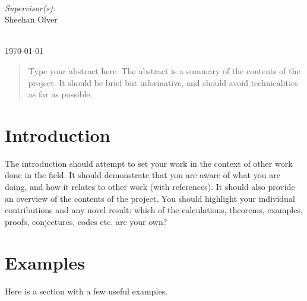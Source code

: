 \documentclass[a4paper,11pt, titlepage]{article}
\theoremstyle{definition}
\theoremstyle{plain}
\theoremstyle{remark}
\newcommand{\supervisor}{Sheehan Olver} %
\begin{document}
\begin{titlepage}
\begin{minipage}{0.4\textwidth}
\end{minipage}
~
\begin{minipage}{0.4\textwidth}
\begin{flushright} \large
\emph{Supervisor(s):} \\
\supervisor %
\end{flushright}
\end{minipage}\\[2cm]
\makeatother
\vfill
\makeatletter
{\large \today}\\[2cm] %
\makeatother
\end{titlepage}

\begin{abstract}
Type your abstract here. The abstract is a summary of the contents of the project. It should be brief but informative, and
should avoid technicalities as far as possible.
\end{abstract}
 
\tableofcontents
\clearpage

\section{Introduction}
\label{sec:introduction}

The introduction should attempt to set your work in the context of other work done in the field. It
should demonstrate that you are aware of what you are doing, and how it relates to other work
(with references). It should also provide an overview of the contents of the project. You should
highlight your individual contributions and any novel result: which of the calculations, theorems,
examples, proofs, conjectures, codes etc. are your own?

\section{Examples}

Here is a section with a few useful examples. 
\end{document}

